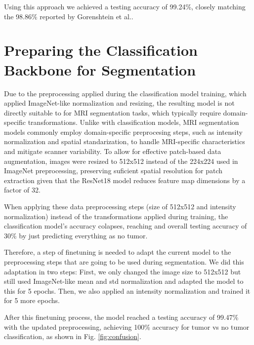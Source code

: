 \documentclass[conference]{IEEEtran}
\begin{document}
Using this approach we achieved a testing accuracy of 99.24\%, closely matching the 98.86\% reported by Gorenshtein et al.\cite{Gorenshtein2025}.

\section{Preparing the Classification Backbone for Segmentation}

Due to the preprocessing applied during the classification model training, which applied ImageNet-like normalization and resizing, the resulting model is not directly suitable to for MRI segmentation tasks, which typically require domain-specific transformations. Unlike with classification models, MRI segmentation models commonly employ domain-specific preprocesing steps, such as intensity normalization and spatial standarization, to handle MRI-specific characteristics and mitigate scanner variability\cite{Wang2024}. To allow for effective patch-based data augmentation, images were resized to 512x512 instead of the 224x224 used in ImageNet preprocessing, preserving suficient spatial resolution for patch extraction given that the ResNet18 model reduces feature map dimensions by a factor of 32.

When applying these data preprocessing steps (size of 512x512 and intensity normalization) instead of the transformations applied during training, the classification model's accuracy colapses, reaching and overall testing accuracy of 30\% by just predicting everything as no tumor. 

Therefore, a step of finetuning is needed to adapt the current model to the preprocessing steps that are going to be used during segmentation. We did this adaptation in two steps: First, we only changed the image size to 512x512 but still used ImageNet-like mean and std normalization and adapted the model to this for 5 epochs. Then, we also applied an intensity normalization and trained it for 5 more epochs.

After this finetuning process, the model reached a testing accuracy of 99.47\% with the updated preprocessing, achieving 100\% accuracy for tumor vs no tumor classification, as shown in Fig. \ref{fig:confusion}. 
\end{document}
